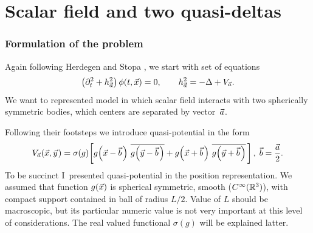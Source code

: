 \documentclass[10pt,t]{beamer}
\begin{document}
\section{Scalar field and two quasi-deltas}



\begin{frame}
  \frametitle{Formulation of the problem}


  Again following Herdegen and Stopa
  \parencite{Herdegen-Stopa-Global-vs-local-ETC-2010}, we start with set of
  equations
  \begin{equation}
    \label{eq:Scalar-field-and-two-quasi-deltas-01}
    \left( \partial_{ t }^{ 2 } + h_{ \vec{a} }^{ 2 } \right) \phi( t, \vec{x} ) = 0, \qquad
    h_{ \vec{a} }^{ 2 } = -\Delta + V_{ \vec{a} }.
  \end{equation}
  We want to represented model in which scalar field interacts with two
  spherically symmetric bodies, which centers are separated by
  vector~$\vec{a}$.

  Following their footsteps we introduce quasi-potential in the form
  \begin{equation}
    \label{eq:Scalar-field-and-two-quasi-deltas-02}
    V_{ \vec{a} }( \vec{x}, \vec{y} \hspace{0.09em} ) =
    \sigma( g ) \! \left[ g\!\left( \vec{x} - \vec{b} \hspace{0.11em} \right) \,
      \overline{ g\!\left( \vec{y} - \vec{b} \hspace{0.11em} \right) }
      + g\!\left( \vec{x} + \vec{b} \hspace{0.11em} \right) \,
      \overline{ g\!\left( \vec{y} + \vec{b} \hspace{0.11em} \right) } \,
    \right], \;
    \vec{b} = \frac{ \vec{a} }{ 2 }.
  \end{equation}
  To be succinct I~presented quasi-potential in the position representation.
  We assumed that function $g( \vec{x} )$ is spherical symmetric, smooth
  ($C^{ \infty }( \mathbb{R}^{ 3 } )$), with compact support contained in ball of
  radius $L / 2$. Value of $L$
  should be macroscopic, but its particular numeric value is not very
  important at this level of considerations. The real valued functional
  $\sigma( g )$ will be explained latter.

\end{frame}
\end{document}
